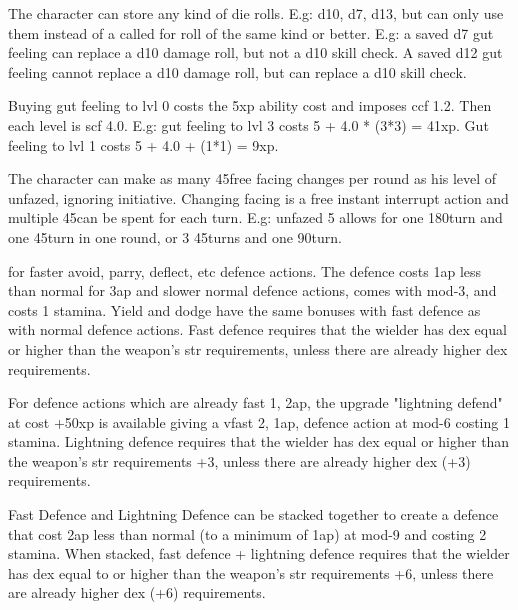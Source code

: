 The character can store any kind of die rolls. E.g: d10, d7, d13, but can only use them instead of a called for roll of the same kind or better. E.g: a saved d7 gut feeling can replace a d10 damage roll, but not a d10 skill check. A saved d12 gut feeling cannot replace a d10 damage roll, but can replace a d10 skill check.

Buying gut feeling to lvl 0 costs the 5xp ability cost and imposes ccf 1.2. Then each level is scf 4.0. E.g: gut feeling to lvl 3 costs 5 + 4.0 * (3*3) = 41xp. Gut feeling to lvl 1 costs 5 + 4.0 + (1*1) = 9xp.



 The character can make as many 45\degrees free facing changes per round as his level of unfazed, ignoring initiative. Changing facing is a free instant interrupt action and multiple 45\degrees can be spent for each turn. E.g: unfazed 5 allows for one 180\degrees turn and one 45\degrees turn in one round, or 3 45\degrees turns and one 90\degrees turn.



 for faster avoid, parry, deflect, etc defence actions. The defence costs 1ap less than normal for 3ap and slower normal defence actions, comes with mod-3, and costs 1 stamina. Yield and dodge have the same bonuses with fast defence as with normal defence actions.
Fast defence requires that the wielder has dex equal or higher than the weapon's str requirements, unless there are already higher dex requirements.

For defence actions which are already fast 1, 2ap, the upgrade "lightning defend" at cost +50xp is available giving a vfast 2, 1ap, defence action at mod-6 costing 1 stamina. Lightning defence requires that the wielder has dex equal or higher than the weapon's str requirements +3, unless there are already higher dex (+3) requirements.

Fast Defence and Lightning Defence can be stacked together to create a defence that cost 2ap less than normal (to a minimum of 1ap) at mod-9 and costing 2 stamina. When stacked, fast defence + lightning defence requires that the wielder has dex equal to or higher than the weapon's str requirements +6, unless there are already higher dex (+6) requirements.


